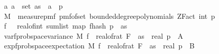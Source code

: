\begin{isabellebody}
\ \ \ {\isachardoublequoteopen}{\isasymAnd}a{\isachardot}{\kern0pt}\ a\ {\isasymin}\ set\ as\ {\isasymLongrightarrow}\ a\ {\isacharless}{\kern0pt}\ p{\isachardoublequoteclose}\isanewline
\ \ \ {\isachardoublequoteopen}M\ {\isasymequiv}\ measure{\isacharunderscore}{\kern0pt}pmf\ {\isacharparenleft}{\kern0pt}pmf{\isacharunderscore}{\kern0pt}of{\isacharunderscore}{\kern0pt}set\ {\isacharparenleft}{\kern0pt}bounded{\isacharunderscore}{\kern0pt}degree{\isacharunderscore}{\kern0pt}polynomials\ {\isacharparenleft}{\kern0pt}ZFact\ {\isacharparenleft}{\kern0pt}int\ p{\isacharparenright}{\kern0pt}{\isacharparenright}{\kern0pt}\ {}{\isacharparenright}{\kern0pt}{\isacharparenright}{\kern0pt}{\isachardoublequoteclose}\isanewline
\ \ \ {\isachardoublequoteopen}f\ {\isasymequiv}\ {\isacharparenleft}{\kern0pt}{\isasymlambda}{\isasymomega}{\isachardot}{\kern0pt}\ real{\isacharunderscore}{\kern0pt}of{\isacharunderscore}{\kern0pt}int\ {\isacharparenleft}{\kern0pt}sum{\isacharunderscore}{\kern0pt}list\ {\isacharparenleft}{\kern0pt}map\ {\isacharparenleft}{\kern0pt}f{}{\isacharunderscore}{\kern0pt}hash\ p\ {\isasymomega}{\isacharparenright}{\kern0pt}\ as{\isacharparenright}{\kern0pt}{\isacharparenright}{\kern0pt}{\isacharcircum}{\kern0pt}{}{\isacharparenright}{\kern0pt}{\isachardoublequoteclose}\isanewline
\ \ \ var{\isacharunderscore}{\kern0pt}f{}{\isacharcolon}{\kern0pt}{\isachardoublequoteopen}prob{\isacharunderscore}{\kern0pt}space{\isachardot}{\kern0pt}variance\ M\ f\ {\isasymle}\ {}{\isacharasterisk}{\kern0pt}{\isacharparenleft}{\kern0pt}real{\isacharunderscore}{\kern0pt}of{\isacharunderscore}{\kern0pt}rat\ {\isacharparenleft}{\kern0pt}F\ {}\ as{\isacharparenright}{\kern0pt}{\isacharcircum}{\kern0pt}{}{\isacharparenright}{\kern0pt}\ {\isacharasterisk}{\kern0pt}\ {\isacharparenleft}{\kern0pt}{\isacharparenleft}{\kern0pt}real\ p{\isacharparenright}{\kern0pt}\ {\isacharparenleft}{\kern0pt}\ {\isachardoublequoteopen}{\isacharquery}{\kern0pt}A{\isachardoublequoteclose}{\isacharparenright}{\kern0pt}\isanewline
\ \ \ exp{\isacharunderscore}{\kern0pt}f{}{\isacharcolon}{\kern0pt}{\isachardoublequoteopen}prob{\isacharunderscore}{\kern0pt}space{\isachardot}{\kern0pt}expectation\ M\ f\ {\isacharequal}{\kern0pt}\ real{\isacharunderscore}{\kern0pt}of{\isacharunderscore}{\kern0pt}rat\ {\isacharparenleft}{\kern0pt}F\ {}\ as{\isacharparenright}{\kern0pt}\ {\isacharasterisk}{\kern0pt}\ {\isacharparenleft}{\kern0pt}{\isacharparenleft}{\kern0pt}real\ p{\isacharparenright}{\kern0pt}\ {\isacharparenleft}{\kern0pt}\ {\isachardoublequoteopen}{\isacharquery}{\kern0pt}B{\isachardoublequoteclose}{\isacharparenright}{\kern0pt}\isanewline

\end{isabellebody}
